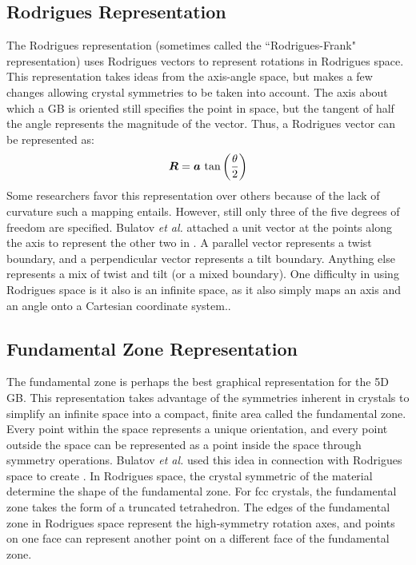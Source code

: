 \documentclass[12pt]{report}
\begin{document}
\subsection{Rodrigues Representation\label{GBReps:Rodrigues}}
The Rodrigues representation (sometimes called the ``Rodrigues-Frank" representation) uses Rodrigues vectors to represent rotations in Rodrigues space.  This representation takes ideas from the axis-angle space, but makes a few changes allowing crystal symmetries to be taken into account.  The axis about which a GB is oriented still specifies the point in space, but the tangent of half the angle represents the magnitude of the vector. Thus, a Rodrigues vector can be represented as:\cite{morawiec1996, becker1989, frank1988, randle2000, priester2013}
\begin{equation}
\bm{R}=\bm{a}\ \textnormal{tan}\left(\frac{\theta}{2}\right)
\label{eq:rodriguesVec}
\end{equation}
Some researchers favor this representation over others because of the lack of curvature such a mapping entails.\cite{frank1988, randle2000}  However, still only three of the five degrees of freedom are specified.  Bulatov \emph{et al.} attached a unit vector at the points along the axis to represent the other two in . A parallel vector represents a twist boundary, and a perpendicular vector represents a tilt boundary.  Anything else represents a mix of twist and tilt (or a mixed boundary).  One difficulty in using Rodrigues space is it also is an infinite space, as it also simply maps an axis and an angle onto a Cartesian coordinate system.\cite{frank1988, kirch2008}.

\subsection{Fundamental Zone Representation\label{GBReps:FunZone}}
The fundamental zone is perhaps the best graphical representation for the 5D GB.  This representation takes advantage of the symmetries inherent in crystals\cite{stokes2007} to simplify an infinite space into a compact, finite area called the fundamental zone.\cite{bulatov2014, patala2013, homer2015, morawiec1996, patala2012}  Every point within the space represents a unique orientation, and every point outside the space can be represented as a point inside the space through symmetry operations.\cite{morawiec1996, becker1989, frank1988}  Bulatov \emph{et al.} used this idea in connection with Rodrigues space to create .  In Rodrigues space, the crystal symmetric of the material determine the shape of the fundamental zone.\cite{patala2013, morawiec1996}  For fcc crystals, the fundamental zone takes the form of a truncated tetrahedron.\cite{bulatov2014}  The edges of the fundamental zone in Rodrigues space represent the high-symmetry rotation axes, and points on one face can represent another point on a different face of the fundamental zone.  
\end{document}
